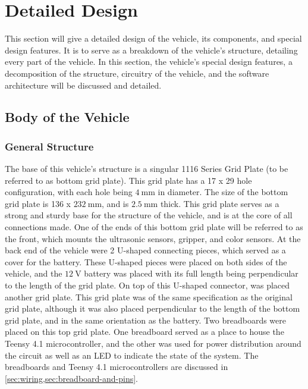 \documentclass[11pt]{report}
\begin{document}
\chapter{Detailed Design}\label{ch:detailed-design}
This section will give a detailed design of the vehicle, its components, and special design features. It is to serve as a breakdown of the vehicle's structure, detailing every part of the vehicle. In this section, the vehicle's special design features, a decomposition of the structure, circuitry of the vehicle, and the software architecture will be discussed and detailed. 

\section{Body of the Vehicle}

\subsection{General Structure}
The base of this vehicle's structure is a singular 1116 Series Grid Plate (to be referred to as bottom grid plate). This grid plate has a  17 x 29 hole configuration, with each hole being $\SI{4}{\milli\meter}$ in diameter. The size of the bottom grid plate is 136 x $\SI{232}{\milli\meter}$, and is $\SI{2.5}{\milli\meter}$ thick. This grid plate serves as a strong and sturdy base for the structure of the vehicle, and is at the core of all connections made. One of the ends of this bottom grid plate will be referred to as the front, which mounts the ultrasonic sensors, gripper, and color sensors. At the back end of the vehicle were 2 U-shaped connecting pieces, which served as a cover for the battery. These U-shaped pieces were placed on both sides of the vehicle, and the $\SI{12}{\volt}$ battery was placed with its full length being perpendicular to the length of the grid plate. On top of this U-shaped connector, was placed another grid plate. This grid plate was of the same specification as the original grid plate, although it was also placed perpendicular to the length of the bottom grid plate, and in the same orientation as the battery. Two breadboards were placed on this top grid plate. One breadboard served as a place to house the Teensy 4.1 microcontroller, and the other was used for power distribution around the circuit as well as an \gls{LED} to indicate the state of the system. The breadboards and Teensy 4.1 microcontrollers are discussed in \cref{sec:wiring,sec:breadboard-and-pins}.
\end{document}
